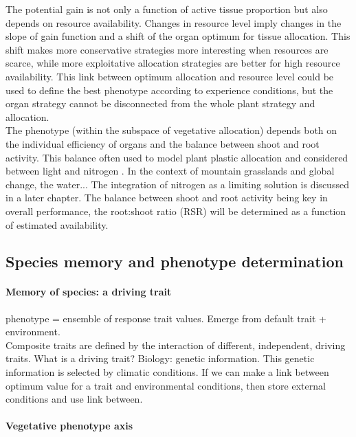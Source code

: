 The potential gain is not only a function of active tissue proportion but also depends on resource availability. Changes in resource level imply changes in the slope of gain function and a shift of the organ optimum for tissue allocation. This shift makes more conservative strategies more interesting when resources are scarce, while more exploitative allocation strategies are better for high resource availability. This link between optimum allocation and resource level could be used to define the best phenotype according to experience conditions, but the organ strategy cannot be disconnected from the whole plant strategy and allocation.\\

The phenotype (within the subspace of vegetative allocation) depends both on the individual efficiency of organs and the balance between shoot and root activity. This balance often used to model plant plastic allocation and considered between light and nitrogen \cite{lohier, soussana}. In the context of mountain grasslands and global change, the water... The integration of nitrogen as a limiting solution is discussed in a later chapter. The balance between shoot and root activity being key in overall performance, the root:shoot ratio (RSR) will be determined as a function of estimated availability.


\subsection{Species memory and phenotype determination}\label{subsection:memory}

\paragraph{Memory of species: a driving trait}

phenotype = ensemble of response trait values. Emerge from default trait + environment.\\
Composite traits are defined by the interaction of different, independent, driving traits. What is a driving trait? Biology: genetic information. This genetic information is selected by climatic conditions. If we can make a link between optimum value for a trait and environmental conditions, then store external conditions and use link between.\\


\paragraph{Vegetative phenotype axis}

